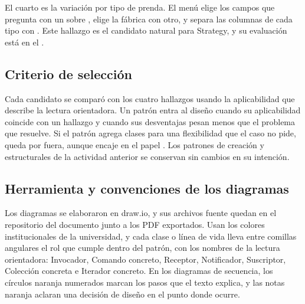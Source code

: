 El cuarto es la variación por tipo de prenda. El menú elige los campos que pregunta con un  sobre ,  elige la fábrica con otro, y  separa las columnas de cada tipo con . Este hallazgo es el candidato natural para Strategy, y su evaluación está en el .

\subsection{Criterio de selección}

Cada candidato se comparó con los cuatro hallazgos usando la aplicabilidad que describe la lectura orientadora. Un patrón entra al diseño cuando su aplicabilidad coincide con un hallazgo y cuando sus desventajas pesan menos que el problema que resuelve. Si el patrón agrega clases para una flexibilidad que el caso no pide, queda por fuera, aunque encaje en el papel . Los patrones de creación y estructurales de la actividad anterior se conservan sin cambios en su intención.

\subsection{Herramienta y convenciones de los diagramas}

Los diagramas se elaboraron en draw.io, y sus archivos fuente quedan en el repositorio del documento junto a los PDF exportados. Usan los colores institucionales de la universidad, y cada clase o línea de vida lleva entre comillas angulares el rol que cumple dentro del patrón, con los nombres de la lectura orientadora: Invocador, Comando concreto, Receptor, Notificador, Suscriptor, Colección concreta e Iterador concreto. En los diagramas de secuencia, los círculos naranja numerados marcan los pasos que el texto explica, y las notas naranja aclaran una decisión de diseño en el punto donde ocurre.

